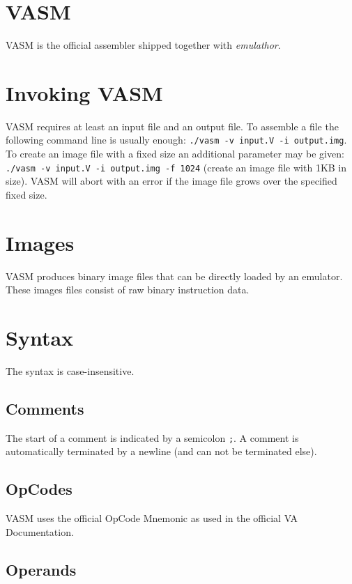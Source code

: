 \section{VASM}

VASM is the official assembler shipped together with \emph{emulathor}. 

\section{Invoking VASM}

VASM requires at least an input file and an output file. To assemble a file the following command line is usually enough:
\verb|./vasm -v input.V -i output.img|. To create an image file with a fixed size an additional parameter may be given:
\verb|./vasm -v input.V -i output.img -f 1024| (create an image file with 1KB in size). VASM will abort with an error if the image file
grows over the specified fixed size. 

\section{Images}

VASM produces binary image files that can be directly loaded by an emulator.
These images files consist of raw binary instruction data. 

\section{Syntax}

The syntax is case-insensitive. 

\subsection{Comments}

The start of a comment is indicated by a semicolon \verb|;|. A comment is automatically terminated by a newline (and can not be terminated else). 

\subsection{OpCodes}

VASM uses the official OpCode Mnemonic as used in the official VA Documentation. 

\subsection{Operands}

